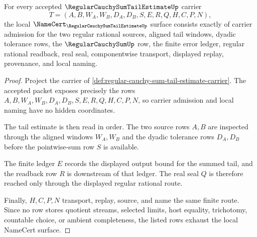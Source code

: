 \begin{theorem}
\label{thm:regular-cauchy-sum-tail-estimate-namecert-obligations}
For every accepted $\RegularCauchySumTailEstimateUp$ carrier
$$
T=(A,B,W_A,W_B,D_A,D_B,S,E,R,Q,H,C,P,N),
$$
the local $\NameCert_{\RegularCauchySumTailEstimateUp}$ surface consists exactly of carrier admission for the two regular rational sources, aligned tail windows, dyadic tolerance rows, the $\RegularCauchySumUp$ row, the finite error ledger, regular rational readback, real seal, componentwise transport, displayed replay, provenance, and local naming.
\end{theorem}
\begin{proof}
Project the carrier of \autoref{def:regular-cauchy-sum-tail-estimate-carrier}. The accepted packet exposes precisely the rows $A,B,W_A,W_B,D_A,D_B,S,E,R,Q,H,C,P,N$, so carrier admission and local naming have no hidden coordinates.

The tail estimate is then read in order. The two source rows $A,B$ are inspected through the aligned windows $W_A,W_B$ and the dyadic tolerance rows $D_A,D_B$ before the pointwise-sum row $S$ is available.

The finite ledger $E$ records the displayed output bound for the summed tail, and the readback row $R$ is downstream of that ledger. The real seal $Q$ is therefore reached only through the displayed regular rational route.

Finally, $H,C,P,N$ transport, replay, source, and name the same finite route. Since no row stores quotient streams, selected limits, host equality, trichotomy, countable choice, or ambient completeness, the listed rows exhaust the local NameCert surface.
\end{proof}

